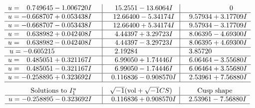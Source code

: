 \documentclass[1p]{elsarticle_modified}
\theoremstyle{definition}
\newcommand{\I}{\sqrt{-1}}
\begin{document}
$$\begin{array}{c|c|c}
\begin{aligned}
u &= \phantom{-}0.749645 - 1.006720 I\end{aligned}
 & \phantom{-}15.2551 - 13.6064 I & \phantom{-0.000000 } 0 \\ \hline\begin{aligned}
u &= -0.668707 + 0.053438 I\end{aligned}
 & \phantom{-}12.66400 - 5.34174 I & \phantom{-}9.57934 + 3.17709 I \\ \hline\begin{aligned}
u &= -0.668707 - 0.053438 I\end{aligned}
 & \phantom{-}12.66400 + 5.34174 I & \phantom{-}9.57934 - 3.17709 I \\ \hline\begin{aligned}
u &= \phantom{-}0.638982 + 0.042408 I\end{aligned}
 & \phantom{-}4.44397 + 3.29723 I & \phantom{-}8.06395 - 4.69300 I \\ \hline\begin{aligned}
u &= \phantom{-}0.638982 - 0.042408 I\end{aligned}
 & \phantom{-}4.44397 - 3.29723 I & \phantom{-}8.06395 + 4.69300 I \\ \hline\begin{aligned}
u &= -0.605215\phantom{ +0.000000I}\end{aligned}
 & \phantom{-}2.19284\phantom{ +0.000000I} & \phantom{-}3.85720\phantom{ +0.000000I} \\ \hline\begin{aligned}
u &= \phantom{-}0.485051 + 0.321167 I\end{aligned}
 & \phantom{-}6.99050 + 1.74446 I & \phantom{-}6.06464 - 3.55680 I \\ \hline\begin{aligned}
u &= \phantom{-}0.485051 - 0.321167 I\end{aligned}
 & \phantom{-}6.99050 - 1.74446 I & \phantom{-}6.06464 + 3.55680 I \\ \hline\begin{aligned}
u &= -0.258895 + 0.323692 I\end{aligned}
 & \phantom{-}0.116836 - 0.908570 I & \phantom{-}2.53961 + 7.56880 I\\
 \hline 
 \end{array}$$\newpage$$\begin{array}{c|c|c}  
\text{Solutions to }I^u_{1}& \I (\text{vol} + \sqrt{-1}CS) & \text{Cusp shape}\\
 \hline 
\begin{aligned}
u &= -0.258895 - 0.323692 I\end{aligned}
 & \phantom{-}0.116836 + 0.908570 I & \phantom{-}2.53961 - 7.56880 I\\
 \hline 
 \end{array}$$\newpage
\end{document}
